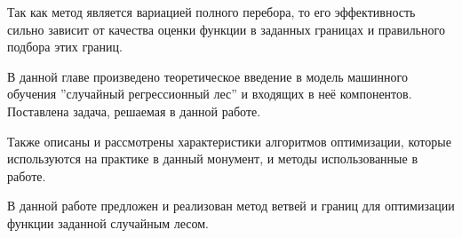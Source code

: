 Так как метод является вариацией полного перебора, то его эффективность сильно
зависит от качества оценки функции в заданных границах и правильного подбора
этих границ.

\chapterconclusion

В данной главе произведено теоретическое введение в модель машинного обучения
''случайный регрессионный лес'' и входящих в неё компонентов. Поставлена задача,
решаемая в данной работе. 

Также описаны и рассмотрены характеристики алгоритмов оптимизации, которые
используются на практике в данный монумент, и методы использованные в работе.

В данной работе предложен и реализован метод ветвей и границ для оптимизации
функции заданной случайным лесом.
